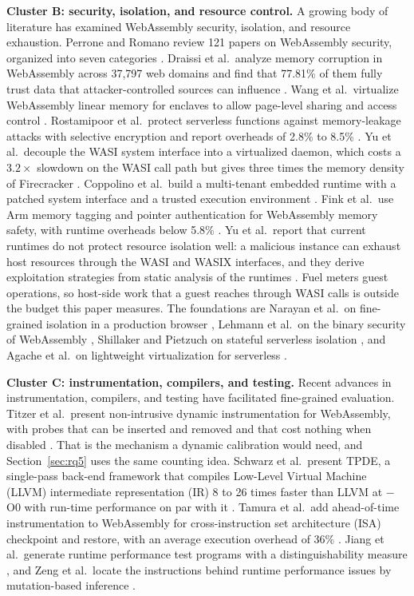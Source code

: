 \documentclass{ws-jcsc}
\begin{document}
\textbf{Cluster B: security, isolation, and resource control.} A growing body of literature has examined WebAssembly security, isolation, and resource exhaustion. Perrone and Romano review 121 papers on WebAssembly security, organized into seven categories \cite{perrone2025security}. Draissi et al.\ analyze memory corruption in WebAssembly across 37{,}797 web domains and find that 77.81\% of them fully trust data that attacker-controlled sources can influence \cite{draissi2025wemby}. Wang et al.\ virtualize WebAssembly linear memory for enclaves to allow page-level sharing and access control \cite{wang2025waven}. Rostamipoor et al.\ protect serverless functions against memory-leakage attacks with selective encryption and report overheads of 2.8\% to 8.5\% \cite{rostamipoor2025leakless}. Yu et al.\ decouple the WASI system interface into a virtualized daemon, which costs a $3.2\times$ slowdown on the WASI call path but gives three times the memory density of Firecracker \cite{yu2026wasc}. Coppolino et al.\ build a multi-tenant embedded runtime with a patched system interface and a trusted execution environment \cite{coppolino2025wasmbox}. Fink et al.\ use Arm memory tagging and pointer authentication for WebAssembly memory safety, with runtime overheads below 5.8\% \cite{fink2025cage}. Yu et al.\ report that current runtimes do not protect resource isolation well: a malicious instance can exhaust host resources through the WASI and WASIX interfaces, and they derive exploitation strategies from static analysis of the runtimes \cite{yu2025resource}. Fuel meters guest operations, so host-side work that a guest reaches through WASI calls is outside the budget this paper measures. The foundations are Narayan et al.\ on fine-grained isolation in a production browser \cite{narayan2020firefox}, Lehmann et al.\ on the binary security of WebAssembly \cite{lehmann2020binary}, Shillaker and Pietzuch on stateful serverless isolation \cite{shillaker2020faasm}, and Agache et al.\ on lightweight virtualization for serverless \cite{agache2020firecracker}.

\textbf{Cluster C: instrumentation, compilers, and testing.} Recent advances in instrumentation, compilers, and testing have facilitated fine-grained evaluation. Titzer et al.\ present non-intrusive dynamic instrumentation for WebAssembly, with probes that can be inserted and removed and that cost nothing when disabled \cite{titzer2024flexible}. That is the mechanism a dynamic calibration would need, and Section~\ref{sec:rq5} uses the same counting idea. Schwarz et al.\ present TPDE, a single-pass back-end framework that compiles Low-Level Virtual Machine (LLVM) intermediate representation (IR) 8 to 26 times faster than LLVM at $-$O0 with run-time performance on par with it \cite{schwarz2026tpde}. Tamura et al.\ add ahead-of-time instrumentation to WebAssembly for cross-instruction set architecture (ISA) checkpoint and restore, with an average execution overhead of 36\% \cite{tamura2025bringing}. Jiang et al.\ generate runtime performance test programs with a distinguishability measure \cite{jiang2025warpgen}, and Zeng et al.\ locate the instructions behind runtime performance issues by mutation-based inference \cite{zeng2026warpl}.
\end{document}
